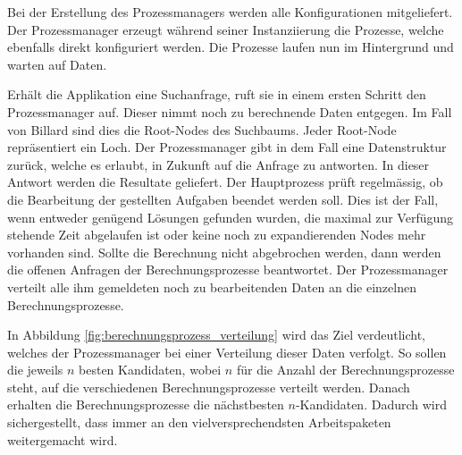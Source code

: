 Bei der Erstellung des Prozessmanagers werden alle Konfigurationen mitgeliefert. Der Prozessmanager erzeugt während seiner
Instanziierung die Prozesse, welche ebenfalls direkt konfiguriert werden. Die Prozesse laufen nun im Hintergrund und
warten auf Daten.

Erhält die Applikation eine Suchanfrage, ruft sie in einem ersten Schritt den Prozessmanager auf.
Dieser nimmt noch zu berechnende Daten entgegen. Im Fall von Billard sind dies die Root-Nodes des Suchbaums.
Jeder Root-Node repräsentiert ein Loch. Der Prozessmanager gibt in dem Fall eine Datenstruktur zurück, welche es erlaubt,
in Zukunft auf die Anfrage zu antworten. In dieser Antwort werden die Resultate geliefert.
Der Hauptprozess prüft regelmässig, ob die Bearbeitung der gestellten Aufgaben beendet werden soll.
Dies ist der Fall, wenn entweder genügend Lösungen gefunden wurden, die maximal zur Verfügung stehende Zeit abgelaufen ist
oder keine noch zu expandierenden Nodes mehr vorhanden sind.
Sollte die Berechnung nicht abgebrochen werden, dann werden die offenen Anfragen der Berechnungsprozesse beantwortet.
Der Prozessmanager verteilt alle ihm gemeldeten noch zu bearbeitenden Daten an die einzelnen Berechnungsprozesse.

In Abbildung \ref{fig:berechnungsprozess_verteilung} wird das Ziel verdeutlicht, welches der Prozessmanager bei einer
Verteilung dieser Daten verfolgt. So sollen die jeweils $n$ besten Kandidaten, wobei $n$ für die Anzahl der Berechnungsprozesse
steht, auf die verschiedenen Berechnungsprozesse verteilt werden. Danach erhalten die Berechnungsprozesse die nächstbesten
$n$-Kandidaten. Dadurch wird sichergestellt, dass immer an den vielversprechendsten Arbeitspaketen weitergemacht wird.

